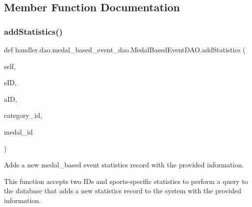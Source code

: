 \subsection{Member Function Documentation}
\mbox{\label{classhandler_1_1dao_1_1medal__based__event__dao_1_1_medal_based_event_d_a_o_ad9b8fae6fc216c19d4f4a4b612c270c8}} 
\subsubsection{\texorpdfstring{add\+Statistics()}{addStatistics()}}
{\footnotesize\ttfamily def handler.\+dao.\+medal\+\_\+based\+\_\+event\+\_\+dao.\+Medal\+Based\+Event\+D\+A\+O.\+add\+Statistics (\begin{DoxyParamCaption}\item[{}]{self,  }\item[{}]{e\+ID,  }\item[{}]{a\+ID,  }\item[{}]{category\+\_\+id,  }\item[{}]{medal\+\_\+id }\end{DoxyParamCaption})}



Adds a new medal\+\_\+based event statistics record with the provided information. 

This function accepts two I\+Ds and sports-\/specific statistics to perform a query to the database that adds a new statistics record to the system with the provided information.


